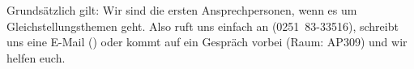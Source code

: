 \begin{multicols}{2}
Grundsätzlich gilt: Wir sind die ersten Ansprechpersonen, wenn es um Gleichstellungsthemen geht. Also ruft uns einfach an \mbox{(0251 83-33516)}, schreibt uns eine E-Mail (\textbf{}) oder kommt auf ein Gespräch vorbei (Raum: AP309) und wir helfen euch.


\end{multicols}
